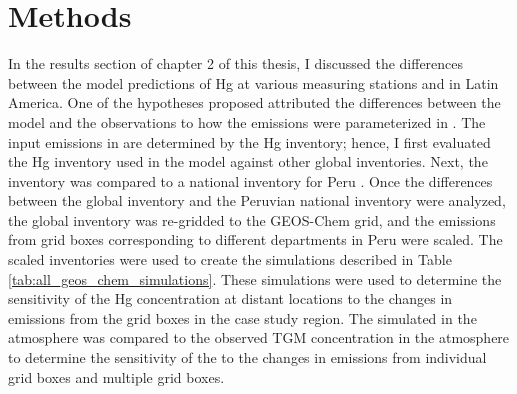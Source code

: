 \section{Methods}
\begin{flushleft}
    In the results section of chapter 2 of this thesis, I discussed the differences between the \gc model predictions of Hg at various measuring stations and in Latin America. One of the hypotheses proposed attributed the differences between the model and the observations to how the emissions were parameterized in \gc. The input emissions in \gc are determined by the Hg inventory; hence, I first evaluated the Hg inventory used in the model against other global inventories. Next, the inventory was compared to a national inventory for Peru \cite{agc_reporte_2017}. Once the differences between the global inventory\cite{steenhuisen_development_2019} and the Peruvian national inventory were analyzed, the global inventory was re-gridded to the GEOS-Chem grid, and the emissions from grid boxes corresponding to different departments in Peru were scaled. The scaled inventories were used to create the simulations described in Table \ref{tab:all_geos_chem_simulations}. These simulations were used to determine the sensitivity of the Hg concentration at distant locations to the changes in emissions from the grid boxes in the case study region. The simulated \hgc in the atmosphere was compared to the observed TGM concentration in the atmosphere to determine the sensitivity of the \hgc to the changes in emissions from individual grid boxes and multiple grid boxes. 
\end{flushleft}

